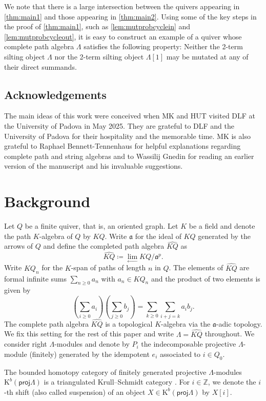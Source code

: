\documentclass[11pt]{amsart}
\newcommand{\proj}{\mathsf{proj}}
\newcommand{\K}{\mathrm{K}}
\newcommand{\mfrak}{\mathfrak{a}}
\theoremstyle{definition}
\begin{document}
We note that there is a large intersection between the quivers appearing in \cref{thm:main1} and those appearing in \cref{thm:main2}. Using some of the key steps in the proof of \cref{thm:main1}, such as \cref{lem:mutprobcyclein} and \cref{lem:mutprobcycleout}, it is easy to construct an example of a quiver whose complete path algebra $\Lambda$ satisfies the following property: Neither the 2-term silting object $\Lambda$ nor the 2-term silting object $\Lambda[1]$ may be mutated at any of their direct summands.


\subsection*{Acknowledgements} The main ideas of this work were conceived when MK and HUT visited DLF at the University of Padova in May 2025. They are grateful to DLF and the University of Padova for their hospitality and the memorable time. MK is also grateful to Raphael Bennett-Tennenhaus for helpful explanations regarding complete path and string algebras and to Wassilij Gnedin for reading an earlier version of the manuscript and his invaluable suggestions. 




\section{Background}


Let $Q$ be a finite quiver, that is, an oriented graph. Let $K$ be a field and denote the path $K$-algebra of $Q$ by $K Q$. Write $\mathfrak{a}$ for the ideal of $KQ$ generated by the arrows of $Q$ and define the completed path algebra $\widehat{KQ}$ as
\[ \widehat{KQ} \coloneqq \lim \limits_{\longleftarrow} KQ/\mfrak^p. \]
Write $KQ_n$ for the $K$-span of paths of length $n$ in $Q$. The elements of $\widehat{KQ}$ are formal infinite sums $\sum_{n \geq 0} a_n$ with $a_n \in KQ_n$ and the product of two elements is given by
\[ \left( \sum_{i \geq 0} a_i \right) \left( \sum_{j \geq 0} b_j \right) = \sum_{k \geq 0} \sum_{i+j = k} a_i b_j. \]
The complete path algebra $\widehat{KQ}$ is a topological $K$-algebra via the $\mathfrak{a}$-adic topology. We fix this setting for the rest of this paper and write $\Lambda = \widehat{KQ}$ throughout. We consider right $\Lambda$-modules and denote by $P_i$ the indecomposable projective $\Lambda$-module (finitely) generated by the idempotent $e_i$ associated to $i \in Q_0$.


The bounded homotopy category of finitely generated projective $\Lambda$-modules $\mathrm{K}^b(\proj \Lambda)$ is a triangulated Krull--Schmidt category \cite[Lem. 2.17]{KellerYang2011} . For $i \in \mathbb{Z}$, we denote the $i$-th shift (also called suspension) of an object $X \in \K^b(\proj \Lambda)$ by $X[i]$.
\end{document}

